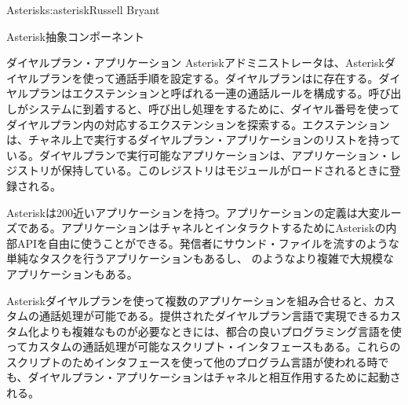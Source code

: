 \begin{aosachapter}{Asterisk}{s:asterisk}{Russell Bryant}
\begin{aosasect1}{Asterisk抽象コンポーネント}
\begin{aosasect2}{ダイヤルプラン・アプリケーション}
Asteriskアドミニストレータは、Asteriskダイヤルプランを使って通話手順を設定する。ダイヤルプランはに存在する。ダイヤルプランはエクステンションと呼ばれる一連の通話ルールを構成する。呼び出しがシステムに到着すると、呼び出し処理をするために、ダイヤル番号を使ってダイヤルプラン内の対応するエクステンションを探索する。エクステンションは、チャネル上で実行するダイヤルプラン・アプリケーションのリストを持っている。ダイヤルプランで実行可能なアプリケーションは、アプリケーション・レジストリが保持している。このレジストリはモジュールがロードされるときに登録される。

Asteriskは200近いアプリケーションを持つ。アプリケーションの定義は大変ルーズである。アプリケーションはチャネルとインタラクトするためにAsteriskの内部APIを自由に使うことができる。発信者にサウンド・ファイルを流すのような単純なタスクを行うアプリケーションもあるし、 のようなより複雑で大規模なアプリケーションもある。

Asteriskダイヤルプランを使って複数のアプリケーションを組み合せると、カスタムの通話処理が可能である。提供されたダイヤルプラン言語で実現できるカスタム化よりも複雑なものが必要なときには、都合の良いプログラミング言語を使ってカスタムの通話処理が可能なスクリプト・インタフェースもある。これらのスクリプトのためインタフェースを使って他のプログラム言語が使われる時でも、ダイヤルプラン・アプリケーションはチャネルと相互作用するために起動される。


\end{aosasect2}
\end{aosasect1}
\end{aosachapter}
